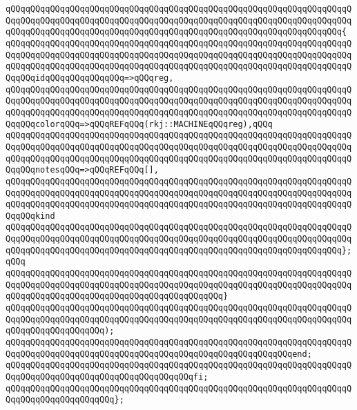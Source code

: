 \verb|qQQqqQQqqQQqqQQqqQQqqQQqqQQqqQQqqQQqqQQqqQQqqQQqqQQqqQQqqQQqqQQqqQQqqQQqqQQqqQQqqQQqqQQqqQQqqQQqqQQqqQQqqQQqqQQqqQQqqQQqqQQqqQQqqQQqqQQqqQQqqQQqqQQqqQQqqQQqqQQqqQQqqQQqqQQqqQQqqQQqqQQqqQQqqQQqqQQqqQQqqQQqqQQq{|\newline
\verb|qQQqqQQqqQQqqQQqqQQqqQQqqQQqqQQqqQQqqQQqqQQqqQQqqQQqqQQqqQQqqQQqqQQqqQQqqQQqqQQqqQQqqQQqqQQqqQQqqQQqqQQqqQQqqQQqqQQqqQQqqQQqqQQqqQQqqQQqqQQqqQQqqQQqqQQqqQQqqQQqqQQqqQQqqQQqqQQqqQQqqQQqqQQqqQQqqQQqqQQqqQQqqQQqqQQqqQQqidqQQqqQQqqQQqqQQq=>qQQqreg,|\newline
\verb|qQQqqQQqqQQqqQQqqQQqqQQqqQQqqQQqqQQqqQQqqQQqqQQqqQQqqQQqqQQqqQQqqQQqqQQqqQQqqQQqqQQqqQQqqQQqqQQqqQQqqQQqqQQqqQQqqQQqqQQqqQQqqQQqqQQqqQQqqQQqqQQqqQQqqQQqqQQqqQQqqQQqqQQqqQQqqQQqqQQqqQQqqQQqqQQqqQQqqQQqqQQqqQQqqQQqqQQqcolorqQQq=>qQQqREFqQQq(rkj::MACHINEqQQqreg),qQQq|\newline
\verb|qQQqqQQqqQQqqQQqqQQqqQQqqQQqqQQqqQQqqQQqqQQqqQQqqQQqqQQqqQQqqQQqqQQqqQQqqQQqqQQqqQQqqQQqqQQqqQQqqQQqqQQqqQQqqQQqqQQqqQQqqQQqqQQqqQQqqQQqqQQqqQQqqQQqqQQqqQQqqQQqqQQqqQQqqQQqqQQqqQQqqQQqqQQqqQQqqQQqqQQqqQQqqQQqqQQqqQQqnotesqQQq=>qQQqREFqQQq[],|\newline
\verb|qQQqqQQqqQQqqQQqqQQqqQQqqQQqqQQqqQQqqQQqqQQqqQQqqQQqqQQqqQQqqQQqqQQqqQQqqQQqqQQqqQQqqQQqqQQqqQQqqQQqqQQqqQQqqQQqqQQqqQQqqQQqqQQqqQQqqQQqqQQqqQQqqQQqqQQqqQQqqQQqqQQqqQQqqQQqqQQqqQQqqQQqqQQqqQQqqQQqqQQqqQQqqQQqqQQqqQQqkind|\newline
\verb|qQQqqQQqqQQqqQQqqQQqqQQqqQQqqQQqqQQqqQQqqQQqqQQqqQQqqQQqqQQqqQQqqQQqqQQqqQQqqQQqqQQqqQQqqQQqqQQqqQQqqQQqqQQqqQQqqQQqqQQqqQQqqQQqqQQqqQQqqQQqqQQqqQQqqQQqqQQqqQQqqQQqqQQqqQQqqQQqqQQqqQQqqQQqqQQqqQQqqQQqqQQqqQQq};qQQq|\newline
\verb|qQQqqQQqqQQqqQQqqQQqqQQqqQQqqQQqqQQqqQQqqQQqqQQqqQQqqQQqqQQqqQQqqQQqqQQqqQQqqQQqqQQqqQQqqQQqqQQqqQQqqQQqqQQqqQQqqQQqqQQqqQQqqQQqqQQqqQQqqQQqqQQqqQQqqQQqqQQqqQQqqQQqqQQqqQQqqQQqqQQqqQQq}|\newline
\verb|qQQqqQQqqQQqqQQqqQQqqQQqqQQqqQQqqQQqqQQqqQQqqQQqqQQqqQQqqQQqqQQqqQQqqQQqqQQqqQQqqQQqqQQqqQQqqQQqqQQqqQQqqQQqqQQqqQQqqQQqqQQqqQQqqQQqqQQqqQQqqQQqqQQqqQQqqQQqqQQq);|\newline
\verb|qQQqqQQqqQQqqQQqqQQqqQQqqQQqqQQqqQQqqQQqqQQqqQQqqQQqqQQqqQQqqQQqqQQqqQQqqQQqqQQqqQQqqQQqqQQqqQQqqQQqqQQqqQQqqQQqqQQqqQQqqQQqqQQqend;|\newline
\verb|qQQqqQQqqQQqqQQqqQQqqQQqqQQqqQQqqQQqqQQqqQQqqQQqqQQqqQQqqQQqqQQqqQQqqQQqqQQqqQQqqQQqqQQqqQQqqQQqqQQqqQQqqQQqfi;|\newline
\verb|qQQqqQQqqQQqqQQqqQQqqQQqqQQqqQQqqQQqqQQqqQQqqQQqqQQqqQQqqQQqqQQqqQQqqQQqqQQqqQQqqQQqqQQqqQQq};|\newline
